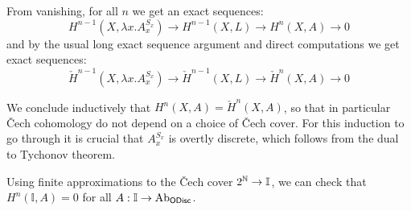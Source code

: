 \documentclass{../util/zariski}
\begin{document}
From vanishing, for all $n$ we get an exact sequences:
\[H^{n-1}(X,\lambda x.A_x^{S_x}) \to H^{n-1}(X,L)\to H^n(X,A)\to 0\]
and by the usual long exact sequence argument and direct computations we get exact sequences:
\[\check{H}^{n-1}(X,\lambda x.A_x^{S_x}) \to \check{H}^{n-1}(X,L)\to \check{H}^n(X,A)\to 0\]

We conclude inductively that $H^n(X,A) = \check{H}^n(X,A)$, so that in particular \v{C}ech cohomology do not depend on a choice of \v{C}ech cover. For this induction to go through it is crucial that $A_x^{S_x}$ is overtly discrete, which follows from the dual to Tychonov theorem.

Using finite approximations to the \v{C}ech cover $2^{\mathbb{N}}\to \mathbb{I}$, we can check that $H^n(\mathbb{I},A) = 0$ for all $A:\mathbb{I}\to \mathrm{Ab}_{\mathsf{ODisc}}$.

\printbibliography
\end{document}
